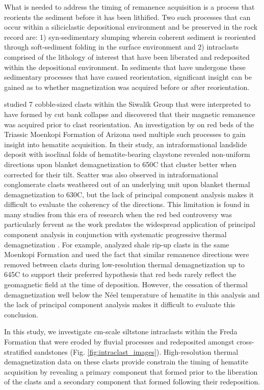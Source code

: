 \documentclass[11pt,letterpaper]{article}
\begin{document}
What is needed to address the timing of remanence acquisition is a process that reorients the sediment before it has been lithified. Two such processes that can occur within a siliciclastic depositional environment and be preserved in the rock record are: 1) syn-sedimentary slumping wherein coherent sediment is reoriented through soft-sediment folding in the surface environment and 2) intraclasts comprised of the lithology of interest that have been liberated and redeposited within the depositional environment. In sediments that have undergone these sedimentary processes that have caused reorientation, significant insight can be gained as to whether magnetization was acquired before or after reorientation. 

\cite{Tauxe1980a} studied 7 cobble-sized clasts within the Siwalik Group that were interpreted to have formed by cut bank collapse and discovered that their magnetic remanence was acquired prior to clast reorientation. An investigation by \cite{Purucker1980a} on red beds of the Triassic Moenkopi Formation of Arizona used multiple such processes to gain insight into hematite acquisition. In their study, an intraformational landslide deposit with isoclinal folds of hematite-bearing claystone revealed non-uniform directions upon blanket demagnetization to 650\textdegree C that cluster better when corrected for their tilt. Scatter was also observed in intraformational conglomerate clasts weathered out of an underlying unit upon blanket thermal demagnetization to 630\textdegree C, but the lack of principal component analysis makes it difficult to evaluate the coherency of the directions. This limitation is found in many studies from this era of research when the red bed controversy was particularly fervent as the work predates the widespread application of principal component analysis in conjunction with systematic progressive thermal demagnetization \citep{Kirschvink1980a, Van-Der-Voo2012a}. For example, \cite{Larson1982b} analyzed shale rip-up clasts in the same Moenkopi Formation and used the fact that similar remanence directions were removed between clasts during low-resolution thermal demagnetization up to 645\textdegree C to support their preferred hypothesis that red beds rarely reflect the geomagnetic field at the time of deposition. However, the cessation of thermal demagnetization well below the N\'eel temperature of hematite in this analysis and the lack of principal component analysis makes it difficult to evaluate this conclusion.  

In this study, we investigate cm-scale siltstone intraclasts within the Freda Formation that were eroded by fluvial processes and redeposited amongst cross-stratified sandstones (Fig. \ref{fig:intraclast_images}). High-resolution thermal demagnetization data on these clasts provide constrain the timing of hematite acquisition by revealing a primary component that formed prior to the liberation of the clasts and a secondary component that formed following their redeposition.
\end{document}
